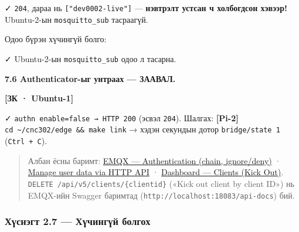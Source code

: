 ✓ \texttt{204}, дараа нь \texttt{{[}"dev0002-live"{]}} --- \textbf{нэвтрэлт устсан ч холбогдсон хэвээр!} Ubuntu-2-ын \texttt{mosquitto\_sub} тасраагүй.

Одоо бүрэн хүчингүй болго:

\begin{Shaded}
\begin{Highlighting}[]
\KeywordTok{|} 
\end{Highlighting}
\end{Shaded}

✓ Ubuntu-2-ын \texttt{mosquitto\_sub} одоо л тасарна.

\textbf{7.6 Authenticator-ыг унтраах --- ЗААВАЛ.}

\textbf{{[}ЗК · Ubuntu-1{]}}

\begin{Shaded}
\begin{Highlighting}[]
\end{Highlighting}
\end{Shaded}

✓ \texttt{authn\ enable=\allowbreak{}false\ →\ HTTP\ 200} (эсвэл \texttt{204}). Шалгах: \textbf{{[}Pi-2{]}} \texttt{cd\ \textasciitilde{}/cnc302/edge\ \&\&\ make\ link} → хэдэн секундын дотор \texttt{bridge/state\ 1} (\texttt{Ctrl\ +\ C}).

\begin{quote}
Албан ёсны баримт: \href{https://docs.emqx.com/en/emqx/v5.8/guides/access-control/authn/authn.html}{EMQX --- Authentication (chain, ignore/\allowbreak{}deny)} · \href{https://docs.emqx.com/en/emqx/v5.8/guides/access-control/authn/user_management.html}{Manage user data via HTTP API} · \href{https://docs.emqx.com/en/emqx/v5.8/guides/dashboard/connections.html}{Dashboard --- Clients (Kick Out)}. \texttt{DELETE\ /\allowbreak{}api/\allowbreak{}v5/\allowbreak{}clients/\allowbreak{}\{clientid\}} («Kick out client by client ID») нь EMQX-ийн Swagger баримтад (\texttt{http:\allowbreak{}/\allowbreak{}/\allowbreak{}localhost:\allowbreak{}18083/\allowbreak{}api-docs}) бий.
\end{quote}

\hypertarget{ux445ux4afux441ux43dux44dux433ux442-2.7-ux445ux4afux447ux438ux43dux433ux4afux439-ux431ux43eux43bux433ux43eux445}{%
\subsubsection{Хүснэгт 2.7 --- Хүчингүй болгох}\label{ux445ux4afux441ux43dux44dux433ux442-2.7-ux445ux4afux447ux438ux43dux433ux4afux439-ux431ux43eux43bux433ux43eux445}}


